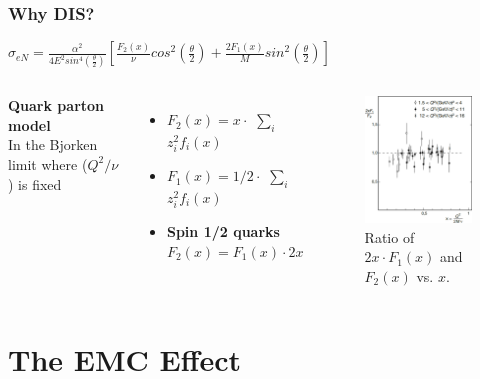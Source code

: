 \documentclass[12pt,usenames,dvipsnames]{beamer}
\begin{document}
\begin{frame}
\frametitle{Why DIS?}
\vspace*{-15pt}
\centering
\large	$\sigma_{eN} = \frac{\alpha^2}{4E^2sin^4(\frac{\theta}{2})} [\frac{F_2(x)}{\nu}cos^2\left(\frac{\theta}{2}\right) + \frac{2F_1(x)}{M}sin^2\left(\frac{\theta}{2}\right)] $

\begin{columns}[c] %
	\textbf{Quark parton model}\\
	In the Bjorken limit where ($Q^2/\nu$) is fixed
\begin{itemize}
	\item $F_2(x) = x \cdot$ $\sum_{i}$ $z_i^2f_i(x) $
	\item $F_1(x) = 1/2 \cdot$ $\sum_{i}$ $z_i^2f_i(x)$
	\item  \textbf{Spin 1/2 quarks} $F_2(x) = F_1(x) \cdot2x$
\end{itemize}



\vspace*{-5pt}
\begin{figure}[t]
	\centering
	\includegraphics[width=4.5cm]{../images/Thesis/f1_f2_spin.pdf} 
	\caption*{Ratio of $2x\cdot F_1(x)$ and $F_2(x)$ vs. $x$. \cite{PnN}}
	
\end{figure}  
\end{columns}
\end{frame}

\section[EMC]{The EMC Effect}
\end{document}
